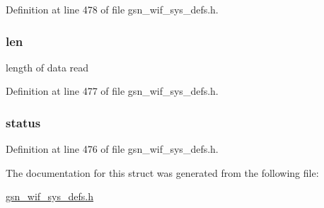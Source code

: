 Definition at line 478 of file gsn\_\-wif\_\-sys\_\-defs.h.

\hypertarget{a00359_ab3bcead9c261261394a5d9b3bf8f95cb}{
\subsubsection[{len}]{ {\bf len}}}
\label{a00359_ab3bcead9c261261394a5d9b3bf8f95cb}
length of data read 

Definition at line 477 of file gsn\_\-wif\_\-sys\_\-defs.h.

\hypertarget{a00359_ace2e01f5af9f89f72123dd8a132b9551}{
\subsubsection[{status}]{ {\bf status}}}
\label{a00359_ace2e01f5af9f89f72123dd8a132b9551}


Definition at line 476 of file gsn\_\-wif\_\-sys\_\-defs.h.



The documentation for this struct was generated from the following file:\begin{DoxyCompactItemize}
\item 
\hyperlink{a00612}{gsn\_\-wif\_\-sys\_\-defs.h}\end{DoxyCompactItemize}
